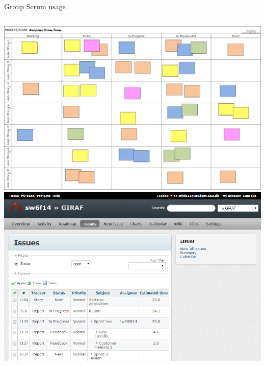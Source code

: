 \begin{frame}{Group Scrum usage}
\begin{columns}
    \begin{column}{0.5\textwidth}
		\includegraphics[width=0.6\textheight]{slides/scrumboard}
		\\
		\linespace
		\includegraphics[width=0.6\textheight]{slides/redmine}
    \end{column}
  \end{columns}
\end{frame}

